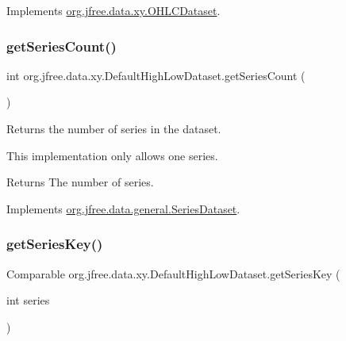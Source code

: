 Implements \mbox{\hyperlink{interfaceorg_1_1jfree_1_1data_1_1xy_1_1_o_h_l_c_dataset_a20654fd4801bc8871dfe51bf65d62af6}{org.\+jfree.\+data.\+xy.\+O\+H\+L\+C\+Dataset}}.

\mbox{\label{classorg_1_1jfree_1_1data_1_1xy_1_1_default_high_low_dataset_a3fc6c7fe46f3adbb8b512c6db2e029aa}} 
\subsubsection{\texorpdfstring{get\+Series\+Count()}{getSeriesCount()}}
{\footnotesize\ttfamily int org.\+jfree.\+data.\+xy.\+Default\+High\+Low\+Dataset.\+get\+Series\+Count (\begin{DoxyParamCaption}{ }\end{DoxyParamCaption})}

Returns the number of series in the dataset. 

This implementation only allows one series.

\begin{DoxyReturn}{Returns}
The number of series. 
\end{DoxyReturn}


Implements \mbox{\hyperlink{interfaceorg_1_1jfree_1_1data_1_1general_1_1_series_dataset_a84fe822f5918f941d9de1ed1b73c9f58}{org.\+jfree.\+data.\+general.\+Series\+Dataset}}.

\mbox{\label{classorg_1_1jfree_1_1data_1_1xy_1_1_default_high_low_dataset_add9d58ed9313fdc2df68c80685aa5175}} 
\subsubsection{\texorpdfstring{get\+Series\+Key()}{getSeriesKey()}}
{\footnotesize\ttfamily Comparable org.\+jfree.\+data.\+xy.\+Default\+High\+Low\+Dataset.\+get\+Series\+Key (\begin{DoxyParamCaption}\item[{int}]{series }\end{DoxyParamCaption})}


